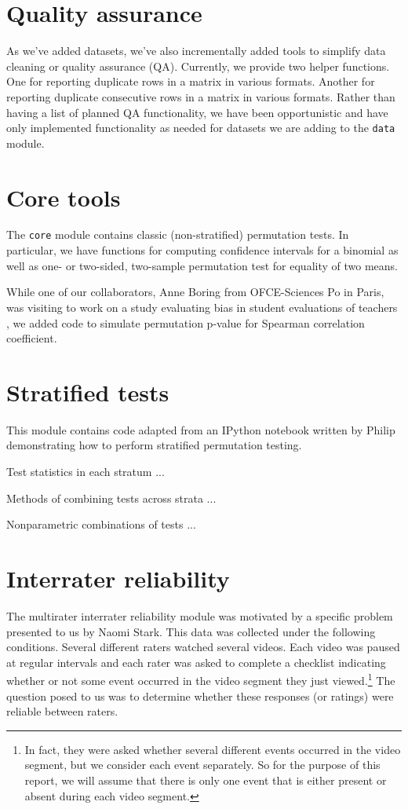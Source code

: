 \section{Quality assurance}

As we've added datasets, we've also incrementally added tools to simplify data
cleaning or quality assurance (QA).  Currently, we provide two helper
functions.  One for reporting duplicate rows in a matrix in various formats.
Another for reporting duplicate consecutive rows in a matrix in various
formats.  Rather than having a list of planned QA functionality, we have been
opportunistic and have only implemented functionality as needed for datasets we
are adding to the \texttt{data} module.

\section{Core tools}

The \texttt{core} module contains classic (non-stratified) permutation tests.
In particular, we have functions for computing confidence intervals for a
binomial as well as one- or two-sided, two-sample permutation test for equality
of two means.

While one of our collaborators, Anne Boring from OFCE-Sciences Po in Paris, was
visiting to work on a study evaluating bias in student evaluations of teachers
\cite{boring2015}, we added code to simulate permutation p-value for Spearman
correlation coefficient.

\section{Stratified tests}

This module contains code adapted from an IPython notebook written by
Philip demonstrating how to perform stratified permutation testing.

Test statistics in each stratum ...

Methods of combining tests across strata ...

Nonparametric combinations of tests ...

\section{\label{sec:irr}Interrater reliability}

The multirater interrater reliability module was motivated by a specific
problem presented to us by Naomi Stark.  This data was collected under the
following conditions.  Several different raters watched several videos.  Each
video was paused at regular intervals and each rater was asked to complete a
checklist indicating whether or not some event occurred in the video segment
they just viewed.\footnote{In fact, they were asked whether several different
events occurred in the video segment, but we consider each event separately.
So for the purpose of this report, we will assume that there is only one event
that is either present or absent during each video segment.} The question posed
to us was to determine whether these responses (or ratings) were reliable
between raters. 

